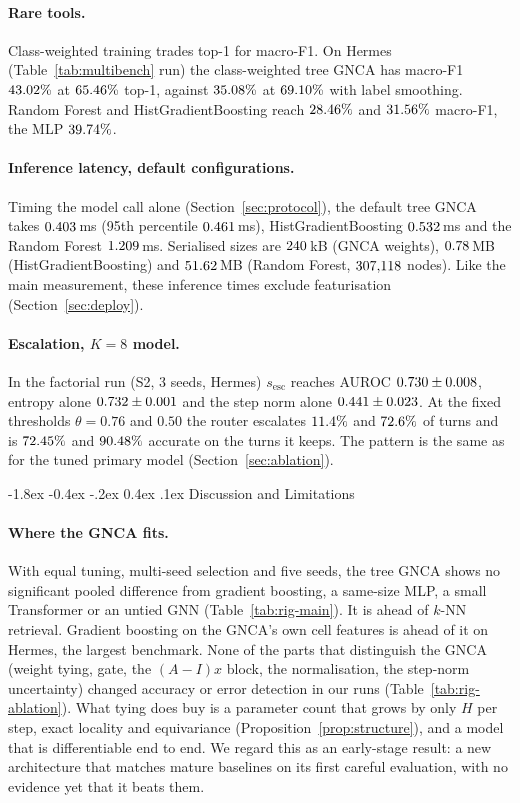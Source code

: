 \documentclass[10pt,twocolumn,letterpaper]{article}
\makeatletter
\renewcommand\section{\@startsection {section}{1}{\z@}%
  {-1.8ex \@plus -0.4ex \@minus -.2ex}%
  {0.4ex \@plus.1ex}%
  {\normalfont\normalsize\bfseries}}
\makeatother
\begin{document}
\paragraph{Rare tools.} Class-weighted training trades top-1 for macro-F1. On Hermes (Table~\ref{tab:multibench} run) the class-weighted tree GNCA has macro-F1 $43.02\%$ at $65.46\%$ top-1, against $35.08\%$ at $69.10\%$ with label smoothing. Random Forest and HistGradientBoosting reach $28.46\%$ and $31.56\%$ macro-F1, the MLP $39.74\%$.
\paragraph{Inference latency, default configurations.} Timing the model call alone (Section~\ref{sec:protocol}), the default tree GNCA takes $0.403$\,ms (95th percentile $0.461$\,ms), HistGradientBoosting $0.532$\,ms and the Random Forest $1.209$\,ms. Serialised sizes are $240$\,kB (GNCA weights), $0.78$\,MB (HistGradientBoosting) and $51.62$\,MB (Random Forest, $307{,}118$ nodes). Like the main measurement, these inference times exclude featurisation (Section~\ref{sec:deploy}).
\paragraph{Escalation, $K{=}8$ model.} In the factorial run (S2, 3 seeds, Hermes) $s_{\text{esc}}$ reaches AUROC $0.730 \pm 0.008$, entropy alone $0.732 \pm 0.001$ and the step norm alone $0.441 \pm 0.023$. At the fixed thresholds $\theta{=}0.76$ and $0.50$ the router escalates $11.4\%$ and $72.6\%$ of turns and is $72.45\%$ and $90.48\%$ accurate on the turns it keeps. The pattern is the same as for the tuned primary model (Section~\ref{sec:ablation}).

\section{Discussion and Limitations}\label{sec:discussion}
\paragraph{Where the GNCA fits.} With equal tuning, multi-seed selection and five seeds, the tree GNCA shows no significant pooled difference from gradient boosting, a same-size MLP, a small Transformer or an untied GNN (Table~\ref{tab:rig-main}). It is ahead of $k$-NN retrieval. Gradient boosting on the GNCA's own cell features is ahead of it on Hermes, the largest benchmark. None of the parts that distinguish the GNCA (weight tying, gate, the $(A{-}I)x$ block, the normalisation, the step-norm uncertainty) changed accuracy or error detection in our runs (Table~\ref{tab:rig-ablation}). What tying does buy is a parameter count that grows by only $H$ per step, exact locality and equivariance (Proposition~\ref{prop:structure}), and a model that is differentiable end to end. We regard this as an early-stage result: a new architecture that matches mature baselines on its first careful evaluation, with no evidence yet that it beats them.
\end{document}
